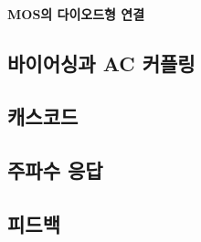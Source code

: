 \paragraph{MOS의 다이오드형 연결}

\subsection{바이어싱과 AC 커플링}

\subsection{캐스코드}

\subsection{주파수 응답}

\subsection{피드백}